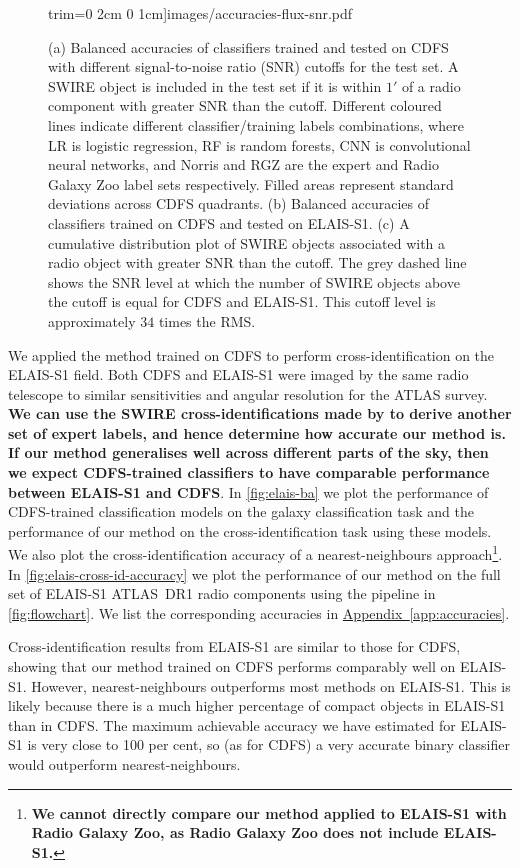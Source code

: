 \documentclass[fleqn,usenatbib,usedcolumn]{mnras}
\newcommand{\edited}[1]{{\bf {#1}}}
\newcommand{\aref}[1]{\hyperref[#1]{Appendix~\ref{#1}}}
\begin{document}
\begin{figure}
                     trim={0 2cm 0 1cm}]{images/accuracies-flux-snr.pdf}
    \caption{(a) Balanced accuracies of classifiers trained and tested on CDFS
      with different signal-to-noise ratio (SNR) cutoffs for the test set. A
      SWIRE object is included in the test set if it is within $1'$ of a radio
      component with greater SNR than the cutoff. Different coloured lines
      indicate different classifier/training labels combinations, where LR is
      logistic regression, RF is random forests, CNN is convolutional neural
      networks, and Norris and RGZ are the expert and Radio Galaxy Zoo label
      sets respectively. Filled areas represent standard deviations across
      CDFS quadrants. (b) Balanced accuracies of classifiers trained on CDFS
      and tested on ELAIS-S1. (c) A cumulative distribution plot of SWIRE
      objects associated with a radio object with greater SNR than the cutoff.
      The grey dashed line shows the SNR level at which the number of SWIRE
      objects above the cutoff is equal for CDFS and ELAIS-S1. This cutoff level
      is approximately $34$ times the RMS.}
    \label{fig:accuracies-flux}
  \end{figure}

  We applied the method trained on CDFS to perform cross-identification on the
  ELAIS-S1 field. Both CDFS and ELAIS-S1 were imaged by the same radio
  telescope to similar sensitivities and angular resolution for the ATLAS
  survey. \edited{We can use the SWIRE cross-identifications made by
  \citet{middelberg08} to derive another set of expert labels, and hence
  determine how accurate our method is. If our method generalises well across
  different parts of the sky, then we expect CDFS-trained classifiers to have
  comparable performance between ELAIS-S1 and CDFS}. In \autoref{fig:elais-ba}
  we plot the performance of CDFS-trained classification models on the galaxy classification task and
  the performance of our method on the cross-identification task using these models. We also plot
  the cross-identification accuracy of a nearest-neighbours approach\footnote{\edited{We cannot
  directly compare our method applied to ELAIS-S1 with Radio Galaxy Zoo, as
  Radio Galaxy Zoo does not include ELAIS-S1.}}. In
  \autoref{fig:elais-cross-id-accuracy} we plot the performance of our method
  on the full set of ELAIS-S1 ATLAS~DR1 radio components using the pipeline in
  \autoref{fig:flowchart}. We list the corresponding accuracies in
  \aref{app:accuracies}.

  Cross-identification results from ELAIS-S1 are similar to those for CDFS,
  showing that our method trained on CDFS performs comparably well on
  ELAIS-S1. However, nearest-neighbours outperforms most methods on ELAIS-S1.
  This is likely because there is a much higher percentage of compact objects
  in ELAIS-S1 than in CDFS. The maximum achievable accuracy we have estimated
  for ELAIS-S1 is very close to 100 per cent, so (as for CDFS) a very accurate
  binary classifier would outperform nearest-neighbours.
\end{document}
